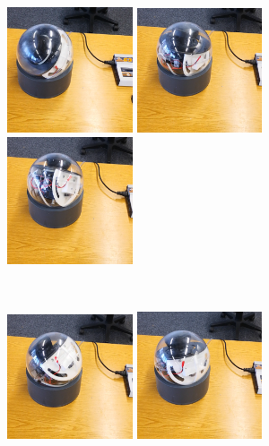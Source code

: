 \begin{figure}
	\centering
	\begin{minipage}[c]{0.5\textwidth}
		\includegraphics[width=0.33\textwidth]{./images/sphere-frame-1.eps}\hfill
		\includegraphics[width=0.33\textwidth]{./images/sphere-frame-2.eps}\hfill
		\includegraphics[width=0.33\textwidth]{./images/sphere-frame-3.eps}\hfill
	\end{minipage}\\
	\begin{minipage}[c]{0.5\textwidth}
		\includegraphics[width=0.33\textwidth]{./images/sphere-frame-4.eps}\hfill
		\includegraphics[width=0.33\textwidth]{./images/sphere-frame-5.eps}\hfill

\end{minipage}
\end{figure}
